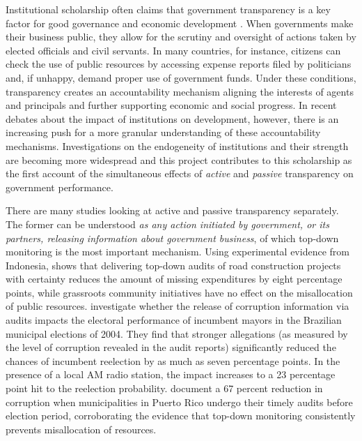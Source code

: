 \documentclass[11pt]{article}
\begin{document}
Institutional scholarship often claims that government transparency is a key factor for good governance and economic development \citep{KaufmannGovernanceMatters1999,BoRothsteinGoodGovernance2012}. When governments make their business public, they allow for the scrutiny and oversight of actions taken by elected officials and civil servants. In many countries, for instance, citizens can check the use of public resources by accessing expense reports filed by politicians and, if unhappy, demand proper use of government funds. Under these conditions, transparency creates an accountability mechanism aligning the interests of agents and principals and further supporting economic and social progress. In recent debates about the impact of institutions on development, however, there is an increasing push for a more granular understanding of these accountability mechanisms. Investigations on the endogeneity of institutions and their strength \citep{AcemogluChapterInstitutionsFundamental2005,LevitskyVariationInstitutionalStrength2009,DalBoInstitutionsBehaviorExperimental2010} are becoming more widespread and this project contributes to this scholarship as the first account of the simultaneous effects of \emph{active} and \emph{passive} transparency on government performance.

There are many studies looking at active and passive transparency separately. The former can be understood \emph{as any action initiated by government, or its partners, releasing information about government business}, of which top-down monitoring is the most important mechanism. Using experimental evidence from Indonesia, \citet{OlkenMonitoringCorruptionEvidence2007c} shows that delivering top-down audits of road construction projects with certainty reduces the amount of missing expenditures by eight percentage points, while grassroots community initiatives have no effect on the misallocation of public resources. \citet{FerrazExposingCorruptPoliticians2008b} investigate whether the release of corruption information via audits impacts the electoral performance of incumbent mayors in the Brazilian municipal elections of 2004. They find that stronger allegations (as measured by the level of corruption revealed in the audit reports) significantly reduced the chances of incumbent reelection by as much as seven percentage points. In the presence of a local AM radio station, the impact increases to a 23 percentage point hit to the reelection probability. \citet{BobonisMonitoringCorruptiblePoliticians2016} document a 67 percent reduction in corruption when municipalities in Puerto Rico undergo their timely audits before election period, corroborating the evidence that top-down monitoring consistently prevents misallocation of resources.
\end{document}

